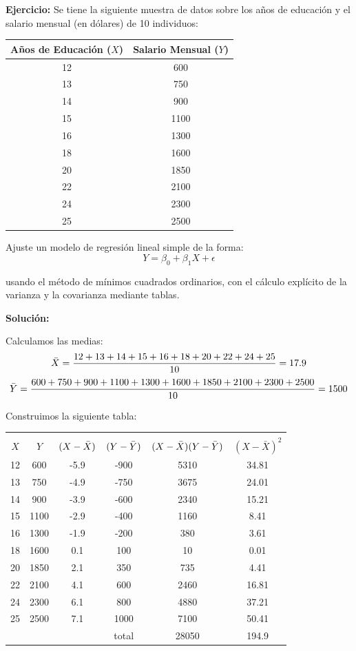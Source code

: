 \documentclass[10pt,a4paper]{article}
\begin{document}
\textbf{Ejercicio:} Se tiene la siguiente muestra de datos sobre los años de educación y el salario mensual (en dólares) de 10 individuos:

\begin{center}
\begin{tabular}{|c|c|}
\hline
Años de Educación ($X$) & Salario Mensual ($Y$) \\
\hline
12  & 600  \\
\hline
13  & 750  \\
\hline
14  & 900  \\
\hline
15  & 1100 \\
\hline
16  & 1300 \\
\hline
18  & 1600 \\
\hline
20  & 1850 \\
\hline
22  & 2100 \\
\hline
24  & 2300 \\
\hline
25  & 2500 \\
\hline
\end{tabular}
\end{center}

Ajuste un modelo de regresión lineal simple de la forma:
$$Y = \beta_0 + \beta_1 X + \epsilon $$


usando el método de mínimos cuadrados ordinarios, con el cálculo explícito de la varianza y la covarianza mediante tablas.

\textbf{Solución:}

Calculamos las medias:
$$\Bar{X} = \frac{12+13+14+15+16+18+20+22+24+25}{10} = 17.9$$
$$\Bar{Y} = \frac{600+750+900+1100+1300+1600+1850+2100+2300+2500}{10} = 1500$$

Construimos la siguiente tabla:

\begin{center}
\begin{tabular}{|c|c|c|c|c|c|}
\hline
& & & & &\\
$X$ & $Y$ & $(X - \Bar{X})$ & $(Y - \Bar{Y})$ & $(X - \Bar{X})(Y - \Bar{Y})$ & $(X - \bar{X})^2$ \\
\hline
12  & 600  & -5.9  & -900  & 5310  & 34.81 \\
\hline
13  & 750  & -4.9  & -750  & 3675  & 24.01 \\
\hline
14  & 900  & -3.9  & -600  & 2340  & 15.21 \\
\hline
15  & 1100 & -2.9  & -400  & 1160  & 8.41  \\
\hline
16  & 1300 & -1.9  & -200  & 380   & 3.61  \\
\hline
18  & 1600 & 0.1   & 100   & 10    & 0.01  \\
\hline
20  & 1850 & 2.1   & 350   & 735   & 4.41  \\
\hline
22  & 2100 & 4.1   & 600   & 2460  & 16.81 \\
\hline
24  & 2300 & 6.1   & 800   & 4880  & 37.21 \\
\hline
25  & 2500 & 7.1   & 1000  & 7100  & 50.41 \\
\hline
& & & total & 28050 & 194.9 \\
\hline
\end{tabular}
\end{center}
\end{document}
